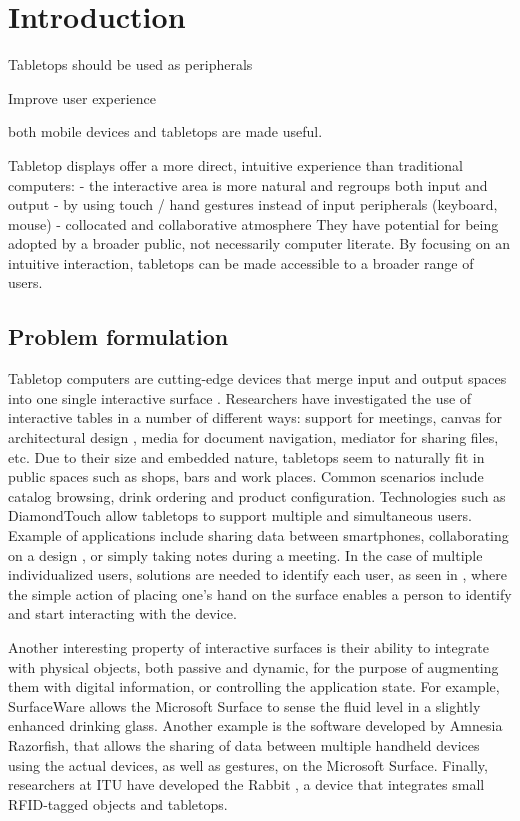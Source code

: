 

\chapter{Introduction}

Tabletops should be used as peripherals

Improve user experience

both mobile devices and tabletops are made useful.

Tabletop displays offer a more direct, intuitive experience than traditional computers:
- the interactive area is more natural and regroups both input and output
- by using touch / hand gestures instead of input peripherals (keyboard, mouse)
- collocated and collaborative atmosphere
They have potential for being adopted by a broader public, not necessarily computer literate.
By focusing on an intuitive interaction, tabletops can be made accessible to a broader range of users.

\section{Problem formulation}

Tabletop computers are cutting-edge devices that merge input and output spaces into one single interactive surface \cite{Wellner:1993:digitaldesk}.
Researchers have investigated the use of interactive tables in a number of different ways: support for meetings, canvas for architectural design \cite{Clifton:2010:sketchtop}, media for document navigation, mediator for sharing files, etc.
Due to their size and embedded nature, tabletops seem to naturally fit in public spaces such as shops, bars and work places.
Common scenarios include catalog browsing, drink ordering and product configuration.
Technologies such as DiamondTouch \cite{Dietz:2001:diamondtouch} allow tabletops to support multiple and simultaneous users. Example of applications include sharing data between smartphones, collaborating on a design \cite{Hunter:2011:memtable}, or simply taking notes during a meeting.
In the case of multiple individualized users, solutions are needed to identify each user, as seen in \cite{Schmidt:2010:handsdown}, where the simple action of placing one's hand on the surface enables a person to identify and start interacting with the device.

Another interesting property of interactive surfaces is their ability to integrate with physical objects, both passive and dynamic, for the purpose of augmenting them with digital information, or controlling the application state.
For example, SurfaceWare \cite{Dietz:2009:surfaceware} allows the Microsoft Surface to sense the fluid level in a slightly enhanced drinking glass.
Another example is the software developed by Amnesia Razorfish, that allows the sharing of data between multiple handheld devices using the actual devices, as well as gestures, on the Microsoft Surface.
Finally, researchers at ITU have developed the Rabbit \cite{Hincapie:2011:rabbit}, a device that integrates small RFID-tagged objects and tabletops.

